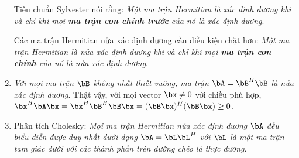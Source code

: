 \begin{enumerate}
    Tiêu chuẩn Sylvester nói rằng: \textit{Một ma trận Hermitian là xác định dương khi và chỉ khi mọi \textbf{ma trận con chính trước} của nó là xác định dương}. 

    Các ma trận Hermitian nửa xác định dương cần điều kiện chặt hơn: \textit{Một
    ma trận Hermitian là nửa xác định dương khi và chỉ khi mọi \textbf{ma trận
    con chính} của nó là nửa xác định dương}.





    \item \textit{Với mọi ma trận $\bB$ không nhất thiết vuông, ma trận $\bA = \bB^H\bB$ là nửa xác định dương}.
    Thật vậy, với mọi vector $\bx \neq 0$ với chiều phù hợp, $\bx^H\bA\bx =
    \bx^H\bB^H\bB\bx = (\bB\bx)^H(\bB\bx) \geq 0$.
    \item Phân tích Cholesky: \textit{Mọi ma trận Hermitian nửa xác định dương
    $\bA$ đều biểu diễn được duy nhất dưới dạng $\bA = \bL\bL^H$ với $\bL$ là
    một ma trận tam giác dưới với các thành phần trên đường chéo là thực dương}.


\end{enumerate}
